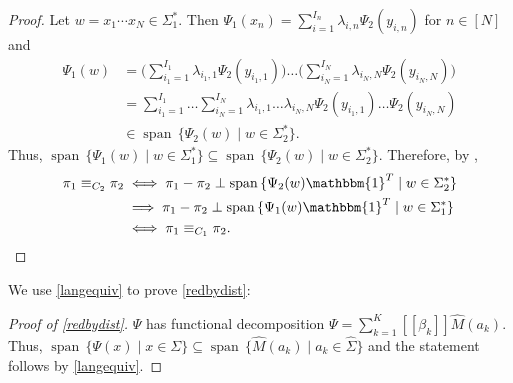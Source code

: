 \documentclass[a4paper,UKenglish,cleveref, autoref,mathscr]{lipics-v2019}
\newcommand{\1}{\mathbbm{1}}
\DeclareMathOperator{\Span}{span\,}
\begin{document}
\begin{proof}
Let $w = x_1\cdots x_N \in \Sigma_1^*$.
Then $\Psi_1(x_n) = \sum_{i = 1}^{I_n} \lambda_{i,n} \Psi_2(y_{i,n})$ for $n \in [N]$ and
\begin{align*}
\Psi_1(w) & = \Big(\sum_{i_1 = 1}^{I_1} \lambda_{i_1,1} \Psi_2(y_{i_1,1}) \Big) \dots \Big(\sum_{i_N = 1}^{I_N} \lambda_{i_N,N} \Psi_2(y_{i_N,N}) \Big) \\
& = \sum_{i_1 = 1}^{I_1} \dots \sum_{i_N = 1}^{I_N} \lambda_{i_1, 1} \dots \lambda_{i_N,N} \Psi_2(y_{i_1, 1}) \dots \Psi_2(y_{i_N, N}) \\
& \in \Span \{ \Psi_2(w) \mid w \in \Sigma_2^*\}.
\end{align*}
Thus, $\Span \{\Psi_1(w) \mid w \in \Sigma_1^*\} \subseteq \Span \{\Psi_2(w) \mid w \in \Sigma_2^*\}$. Therefore, by ,
\begin{align*}
\pi_1 \equiv_{C_2} \pi_2 & \iff \pi_1 - \pi_2 \perp \Span \{\Psi_{2}(w) \1^T \mid w \in \Sigma_2^*\} \\
& \implies \pi_1 - \pi_2 \perp \Span \{\Psi_{1}(w) \1^T \mid w \in \Sigma_1^*\} \\
& \iff \pi_1 \equiv_{C_1} \pi_2. \tag*{\qedhere}
\end{align*}
\end{proof}
We use \cref{langequiv} to prove \cref{redbydist}:
\begin{proof}[Proof of \cref{redbydist}]
$\Psi$ has functional decomposition $\Psi = \sum_{k = 1}^K [\![\beta_k]\!] \hat{M}(a_k)$.
Thus, $\Span \{\Psi(x) \mid x \in \Sigma\} \subseteq \Span \{\hat{M}(a_k) \mid a_k \in \hat{\Sigma}\}$
and the statement follows by \cref{langequiv}.
\end{proof}
\end{document}
